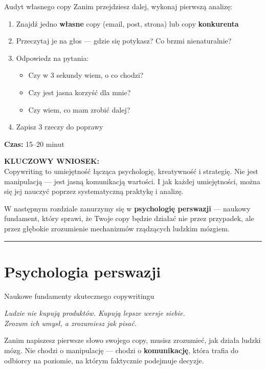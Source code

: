 \documentclass[
  12pt,
  a4paper,
  twoside,
  openright,
  12pt,
  DIV=12,
  BCOR=12mm]{scrbook}
\newcommand{\chapteropener}[1]{%
  \begin{center}
    \large\itshape\color{textmuted}#1
  \end{center}
  \vspace{1em}
}
\newcommand{\decoline}{%
  \begin{center}
    \textcolor{bordergray}{\rule{0.3\textwidth}{0.5pt}}
  \end{center}
}
\newcommand{\takeaway}[1]{%
  \begin{tcolorbox}[
    enhanced,
    colback=accentgreen!10,
    colframe=accentgreen,
    boxrule=0pt,
    borderline south={3pt}{0pt}{accentgreen},
    sharp corners,
    left=15pt, right=15pt, top=10pt, bottom=10pt
  ]
    \textbf{\color{accentgreen}KLUCZOWY WNIOSEK:}\\[5pt]
    #1
  \end{tcolorbox}
}
\begin{document}
\begin{cwiczenie}{Audyt własnego copy}
Zanim przejdziesz dalej, wykonaj pierwszą analizę:

\begin{enumerate}
  \item Znajdź jedno \textbf{własne} copy (email, post, strona) lub copy \textbf{konkurenta}
  \item Przeczytaj je na głos --- gdzie się potykasz? Co brzmi nienaturalnie?
  \item Odpowiedz na pytania:
  \begin{itemize}
    \item Czy w 3 sekundy wiem, o co chodzi?
    \item Czy jest jasna korzyść dla mnie?
    \item Czy wiem, co mam zrobić dalej?
  \end{itemize}
  \item Zapisz 3 rzeczy do poprawy
\end{enumerate}

\textbf{Czas:} 15--20 minut
\end{cwiczenie}

\takeaway{Copywriting to umiejętność łącząca psychologię, kreatywność i strategię. Nie jest manipulacją --- jest jasną komunikacją wartości. I jak każdej umiejętności, można się jej nauczyć poprzez systematyczną praktykę i analizę.}

W następnym rozdziale zanurzymy się w \textbf{psychologię perswazji} ---
naukowy fundament, który sprawi, że Twoje copy będzie działać nie przez
przypadek, ale przez głębokie zrozumienie mechanizmów rządzących ludzkim
mózgiem.

\decoline


\chapter{Psychologia perswazji}\label{psychologia-perswazji}

Naukowe fundamenty skutecznego copywritingu

\hfill\break

\chapteropener{Ludzie nie kupują produktów. Kupują lepsze wersje siebie.\\Zrozum ich umysł, a zrozumiesz jak pisać.}

Zanim napiszesz pierwsze słowo swojego copy, musisz zrozumieć, jak
działa ludzki mózg. Nie chodzi o manipulację --- chodzi o
\textbf{komunikację}, która trafia do odbiorcy na poziomie, na którym
faktycznie podejmuje decyzje.
\end{document}
